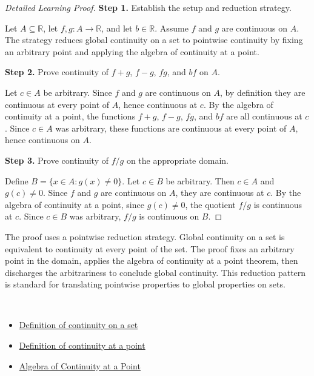 \begin{proof}[Detailed Learning Proof]
\LRAProofBodyStart

\textbf{Step 1.} Establish the setup and reduction strategy.

Let $A \subseteq \mathbb{R}$, let $f,g : A \to \mathbb{R}$, and let $b \in \mathbb{R}$. Assume $f$ and $g$ are continuous on $A$. The strategy reduces global continuity on a set to pointwise continuity by fixing an arbitrary point and applying the algebra of continuity at a point.

\textbf{Step 2.} Prove continuity of $f+g$, $f-g$, $fg$, and $bf$ on $A$.

Let $c \in A$ be arbitrary. Since $f$ and $g$ are continuous on $A$, by definition they are continuous at every point of $A$, hence continuous at $c$. By the algebra of continuity at a point, the functions $f+g$, $f-g$, $fg$, and $bf$ are all continuous at $c$. Since $c \in A$ was arbitrary, these functions are continuous at every point of $A$, hence continuous on $A$.

\textbf{Step 3.} Prove continuity of $f/g$ on the appropriate domain.

Define $B = \{x \in A : g(x) \neq 0\}$. Let $c \in B$ be arbitrary. Then $c \in A$ and $g(c) \neq 0$. Since $f$ and $g$ are continuous on $A$, they are continuous at $c$. By the algebra of continuity at a point, since $g(c) \neq 0$, the quotient $f/g$ is continuous at $c$. Since $c \in B$ was arbitrary, $f/g$ is continuous on $B$.
\end{proof}

\begin{remark*}
The proof uses a pointwise reduction strategy. Global continuity on a set is equivalent to continuity at every point of the set. The proof fixes an arbitrary point in the domain, applies the algebra of continuity at a point theorem, then discharges the arbitrariness to conclude global continuity. This reduction pattern is standard for translating pointwise properties to global properties on sets.
\end{remark*}

\begin{remark*}[Dependencies]~\\
\begin{itemize}
  \item \hyperref[def:continuous-on-a-set]{Definition of continuity on a set}
  \item \hyperref[def:continuous-at-a-point]{Definition of continuity at a point}
  \item \hyperref[thm:algebra-of-continuity-at-a-point]{Algebra of Continuity at a Point}
\end{itemize}
\end{remark*}
